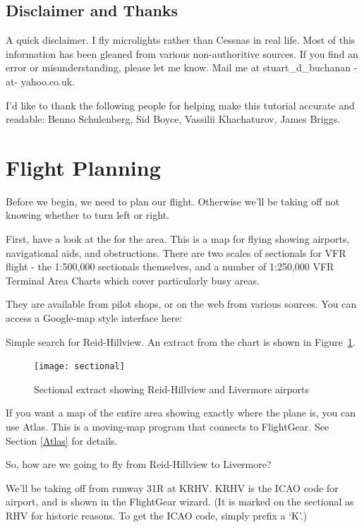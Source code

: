 \subsection{Disclaimer and Thanks}

A quick disclaimer. I fly microlights rather than Cessnas in real life. Most of
this information has been gleaned from various non-authoritive sources. If you
find an error or misunderstanding, please let me know. Mail me at
stuart\_d\_buchanan -at- yahoo.co.uk.

I'd like to thank the following people for helping make this tutorial accurate
and readable: Benno Schulenberg, Sid Boyce, Vassilii Khachaturov, James Briggs.

\section{Flight Planning}

Before we begin, we need to plan our flight.
Otherwise we'll be taking off not knowing whether to turn left or right.

First, have a look at the  for the area. This is a map for
flying showing airports, navigational aids, and obstructions.
There are two scales of sectionals for VFR flight -
the 1:500,000 sectionals themselves, and a number of
1:250,000 VFR Terminal Area Charts which cover particularly busy areas.

They are available from pilot shops, or on the web from various sources.
You can access a Google-map style interface here:

\medskip
{}
\medskip

Simple search for Reid-Hillview. An extract from the chart is shown in Figure~\ref{sectional}.

\begin{figure}[!htp]
\centering
\texttt{[image: sectional]}
\caption{Sectional extract showing Reid-Hillview and Livermore airports\label{sectional}}
\end{figure}

If you want a map of the entire area showing exactly where the plane is,
you can use Atlas.
This is a moving-map program that connects to FlightGear. See Section \ref{Atlas} for details.

So, how are we going to fly from Reid-Hillview to Livermore?

We'll be taking off from runway 31R at KRHV. KRHV is the ICAO code
for  airport, and is shown in the FlightGear wizard.
(It is marked on the sectional as RHV for historic reasons.
To get the ICAO code, simply prefix a `K'.)

